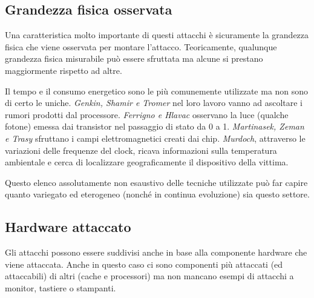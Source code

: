 		\subsection*{Grandezza fisica osservata}		
			Una caratteristica molto importante di questi attacchi è sicuramente la grandezza fisica che viene osservata per montare l'attacco. Teoricamente, qualunque grandezza fisica misurabile può essere sfruttata ma alcune si prestano maggiormente rispetto ad altre. 
			
			Il tempo e il consumo energetico sono le più comunemente utilizzate ma non sono di certo le uniche. \emph{Genkin, Shamir e Tromer} nel loro lavoro \cite{genkin2014rsa} vanno ad ascoltare i rumori prodotti dal processore. \emph{Ferrigno e Hlavac}\cite{ferrigno2008aes} osservano la luce (qualche fotone) emessa dai transistor nel passaggio di stato da 0 a 1. \emph{Martinasek, Zeman e Trasy}\cite{martinasek2012simple} sfruttano i campi elettromagnetici creati dai chip. \emph{Murdoch}, attraverso le variazioni delle frequenze del clock, ricava informazioni sulla temperatura ambientale e cerca di localizzare geograficamente il dispositivo della vittima.
			
			Questo elenco assolutamente non esaustivo delle tecniche utilizzate può far capire quanto variegato ed eterogeneo (nonché in continua evoluzione) sia questo settore.
			
		\subsection*{Hardware attaccato}		
			Gli attacchi possono essere suddivisi anche in base alla componente hardware che viene attaccata. Anche in questo caso ci sono componenti più attaccati (ed attaccabili) di altri (cache e processori) ma non mancano esempi di attacchi a monitor\cite{van1985electromagn}, tastiere\cite{asonov2004keyboard} o stampanti\cite{backes2010acoustic}.
			
